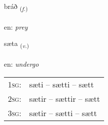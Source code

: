\documentclass[frontgrid, backgrid]{flacards}\usepackage[]{graphicx}\usepackage[]{xcolor}
\begin{document}
\renewcommand{\flhead}{\vskip5pt \fboxsep=0pt {\small\bfseries\footnotesize Nafnorð | Noun}}
\renewcommand{\fcfoot}{\vskip5pt \fboxsep=0pt \hspace{2pt}{\small\bfseries\footnotesize 3K}}

\renewcommand{\blhead}{\vskip5pt {\small\bfseries\footnotesize Nafnorð | Noun }}
\renewcommand{\bcfoot}{\vskip5pt \hspace{2pt}{\small\bfseries\footnotesize 3K}}


{bráð \small{\textsubscript{(\textit{f.})}} \\[1ex] %
\textphonetic{[prauːð]} \\
en: \emph{prey} \\  [2ex]
\renewcommand*{\arraystretch}{0.8}
}

\renewcommand{\flhead}{\vskip5pt \fboxsep=0pt {\small\bfseries\footnotesize Sagnorð | Verb}}
\renewcommand{\fcfoot}{\vskip5pt \fboxsep=0pt \hspace{2pt}{\small\bfseries\footnotesize 3K}}

\renewcommand{\blhead}{\vskip5pt {\small\bfseries\footnotesize Sagnorð | Verb }}
\renewcommand{\bcfoot}{\vskip5pt \hspace{2pt}{\small\bfseries\footnotesize 3K}}


{sæta \small{\textsubscript{(\textit{v.})}} \\[1ex] %
\textphonetic{[saiːta]} \\
en: \emph{undergo} \\  [2ex]
\renewcommand*{\arraystretch}{0.8}
\begin{tabular}{p{1cm}l}
\textsc{1sg}: & sæti -- sætti -- sætt \\ 
\textsc{2sg}: & sætir -- sættir -- sætt \\ 
\textsc{3sg}: & sætir -- sætti -- sætt \\ 
\end{tabular}
}
\end{document}
